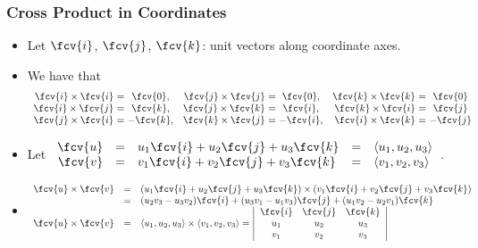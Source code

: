 \begin{frame}
 \frametitle{Cross Product in Coordinates}

\begin{itemize}
\item Let $\fcv{i}$, $\fcv{j}$, $\fcv{k}$: unit vectors along coordinate axes.
\item We have that
\[ 
\begin{array}{r@{}c@{}cr@{}c@{}cr@{}c@{}c}
\fcv{i} \times \fcv{i} &~=~& \fcv{0}, & \fcv{j} \times \fcv{j} &~=~&\fcv{0} , & \fcv{k} \times \fcv{k} &~=~& \fcv{0} \\
\fcv{i} \times \fcv{j} &~=~& \fcv{k}, & \fcv{j} \times \fcv{k} &~=~& \fcv{i}, &  \fcv{k} \times \fcv{i}& ~=~& \fcv{j}\\
\fcv{j} \times \fcv{i} &~=~& -\fcv{k}, & \fcv{k} \times \fcv{j} &~=~& -\fcv{i},& \fcv{i} \times \fcv{k} &~=~& -\fcv{j}
\end{array}
\]
\item Let $\begin{array}{rclcl}
\fcv{u} &=& u_1 \fcv{i} + u_2 \fcv{j} + u_3 \fcv{k} &=& \langle u_1, u_2, u_3 \rangle \\
\fcv{v}&=&v_1 \fcv{i} + v_2 \fcv{j} + v_3 \fcv{k} &=& \langle v_1, v_2, v_3 \rangle\end{array}$.
\item 
\[\begin{array}{rcl}
\fcv{u} \times \fcv{v} &=& (u_1 \fcv{i} + u_2 \fcv{j} + u_3 \fcv{k})
\times (v_1 \fcv{i} + v_2 \fcv{j} + v_3 \fcv{k})\\
&=& (u_2v_3 -u_3v_2) \fcv{i} + (u_3v_1-u_1v_3) \fcv{j} + (u_1v_2-u_2v_1) \fcv{k} \\
\fcv{u} \times \fcv{v} &=& 
\langle u_1, u_2, u_3 \rangle \times \langle v_1, v_2, v_3 \rangle =
\left|
\begin{array}{ccc}
\fcv{i} & \fcv{j} & \fcv{k} \\
u_1 & u_2 & u_3 \\
v_1 & v_2 & v_3
\end{array}
\right|
\end{array}
\]



\end{itemize}
\end{frame}